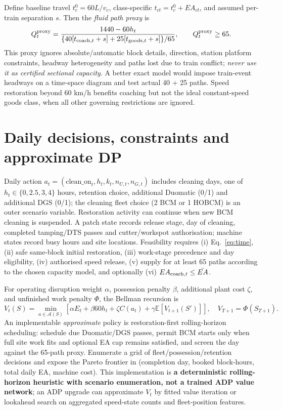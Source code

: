 \documentclass[10pt,a4paper]{article}
\begin{document}
Define baseline travel $t_c^0=60L/v_c$, class-specific $t_{ct}=t_c^0+EA_{ct}$, and assumed per-train separation $s$. Then the \emph{fluid path proxy} is
\begin{equation}
Q_t^{\rm proxy}=\frac{1440-60h_t}{\{40[t_{{\rm coach},t}+s]+25[t_{{\rm goods},t}+s]\}/65},\qquad Q_t^{\rm proxy}\ge65.\label{eq:capacity}
\end{equation}
This proxy ignores absolute/automatic block details, direction, station platform constraints, headway heterogeneity and paths lost due to train conflict; \emph{never use it as certified sectional capacity}. A better exact model would impose train-event headways on a time-space diagram and test actual 40 + 25 paths. Speed restoration beyond 60 km/h benefits coaching but not the ideal constant-speed goods class, when all other governing restrictions are ignored.
\section{Daily decisions, constraints and approximate DP}
Daily action $a_t=(\mathrm{clean\_on}_t,h_t,k_t,n_{U,t},n_{G,t})$ includes cleaning days, one of $h_t\in\{0,2.5,3,4\}$ hours, retention choice, additional Duomatic (0/1) and additional DGS (0/1); the cleaning fleet choice (2 BCM or 1 HOBCM) is an outer scenario variable. Restoration activity can continue when new BCM cleaning is suspended. A patch state records release stage, day of cleaning, completed tamping/DTS passes and cutter/workspot authorisation; machine states record busy hours and site locations. Feasibility requires (i) Eq.~\ref{eq:time}, (ii) safe same-block initial restoration, (iii) work-stage precedence and day eligibility, (iv) authorised speed release, (v) supply for at least 65 paths according to the chosen capacity model, and optionally (vi) $EA_{{\rm coach},t}\le \bar{EA}$.

For operating disruption weight $\alpha$, possession penalty $\beta$, additional plant cost $\zeta$, and unfinished work penalty $\Phi$, the Bellman recursion is
\begin{equation}
V_t(S)=\min_{a\in\mathcal A(S)}\left[\alpha E_t+\beta 60h_t+\zeta C(a_t)+\gamma\mathbb E[V_{t+1}(S')]\right],\quad V_{T+1}=\Phi(S_{T+1}).\label{eq:bellman}
\end{equation}
An implementable \emph{approximate} policy is restoration-first rolling-horizon scheduling: schedule due Duomatic/DGS passes, permit BCM starts only when full site work fits and optional EA cap remains satisfied, and screen the day against the 65-path proxy. Enumerate a grid of fleet/possession/retention decisions and expose the Pareto frontier in (completion day, booked block-hours, total daily EA, machine cost). This implementation is \textbf{a deterministic rolling-horizon heuristic with scenario enumeration, not a trained ADP value network}; an ADP upgrade can approximate $V_t$ by fitted value iteration or lookahead search on aggregated speed-state counts and fleet-position features.
\end{document}
